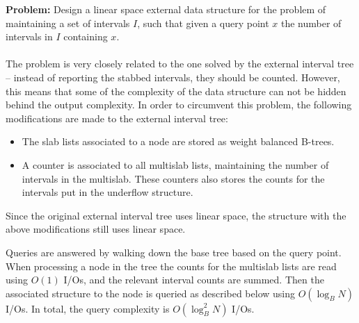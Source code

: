 \documentclass[a4paper,12pt]{article}
\begin{document}
\textbf{Problem:} Design a linear space external data structure for the problem of maintaining a set of intervals $I$, such that given a query point $x$ the number of intervals in $I$ containing $x$.
\\
\\The problem is very closely related to the one solved by the external interval tree -- instead of reporting the stabbed intervals, they should be counted. However, this means that some of the complexity of the data structure can not be hidden behind the output complexity. In order to circumvent this problem, the following modifications are made to the external interval tree:
\begin{itemize}
  \item The slab lists associated to a node are stored as weight balanced B-trees.
  \item A counter is associated to all multislab lists, maintaining the number of intervals in the multislab. These counters also stores the counts for the intervals put in the underflow structure.

\end{itemize}
Since the original external interval tree uses linear space, the structure with the above modifications still uses linear space.

Queries are answered by walking down the base tree based on the query point. When processing a node in the tree the counts for the multislab lists are read using $O(1)$ I/Os, and the relevant interval counts are summed. Then the associated structure to the node is queried as described below using $O(\log_B N)$ I/Os. In total, the query complexity is $O(\log_B^2 N)$ I/Os.
\end{document}
